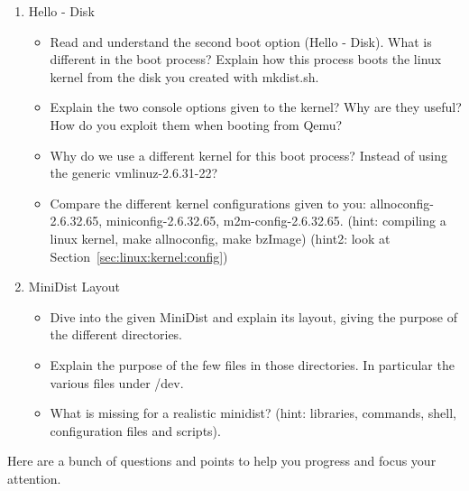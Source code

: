 \documentclass[10]{article}
\begin{document}
\begin{enumerate}
\item Hello - Disk
\begin{itemize}
\item Read and understand the second boot option (Hello - Disk).
What is different in the boot process? Explain how this process
boots the linux kernel from the disk you created with mkdist.sh.
\item Explain the two console options given to the kernel?
Why are they useful? How do you exploit them when booting from Qemu?
\item Why do we use a different kernel for this boot process?
Instead of using the generic vmlinuz-2.6.31-22?
\item Compare the different kernel configurations given to you:
allnoconfig-2.6.32.65, miniconfig-2.6.32.65, m2m-config-2.6.32.65.
(hint: compiling a linux kernel, make allnoconfig, make bzImage)
(hint2: look at Section~\ref{sec:linux:kernel:config})

\end{itemize}

\item MiniDist Layout
\begin{itemize}
\item Dive into the given MiniDist and explain its layout,
giving the purpose of the different directories.
\item Explain the purpose of the few files in those directories.
In particular the various files under /dev.
\item What is missing for a realistic minidist?
(hint: libraries, commands, shell, configuration files and scripts).
\end{itemize}

\end{enumerate}

Here are a bunch of questions and points to help you progress
and focus your attention.
\end{document}

